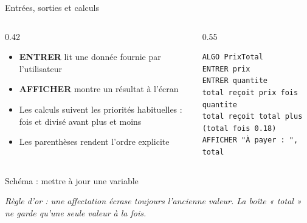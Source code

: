 \documentclass[aspectratio=169,11pt]{beamer}
\begin{document}
\begin{frame}[fragile]{Entrées, sorties et calculs}
\begin{columns}[t]
\begin{column}{0.42\textwidth}
\begin{itemize}
  \setlength{\itemsep}{1.5pt}\setlength{\parskip}{0pt}
  \item \textbf{ENTRER} lit une donnée fournie par l'utilisateur
  \item \textbf{AFFICHER} montre un résultat à l'écran
  \item Les calculs suivent les priorités habituelles : fois et divisé avant plus et moins
  \item Les parenthèses rendent l'ordre explicite
\end{itemize}
\end{column}
\hspace{0.02\textwidth}
\begin{column}{0.55\textwidth}
\begin{lstlisting}[style=pysmall]
ALGO PrixTotal
ENTRER prix
ENTRER quantite
total reçoit prix fois quantite
total reçoit total plus (total fois 0.18)
AFFICHER "À payer : ", total
\end{lstlisting}
\end{column}
\end{columns}
\end{frame}

\begin{frame}{Schéma : mettre à jour une variable}

\begin{center}
\end{center}

\vspace{6pt}

{\small\color{PyGris}\itshape Règle d'or : une affectation écrase toujours l'ancienne valeur. La boîte « total » ne garde qu'une seule valeur à la fois.}

\end{frame}
\end{document}
